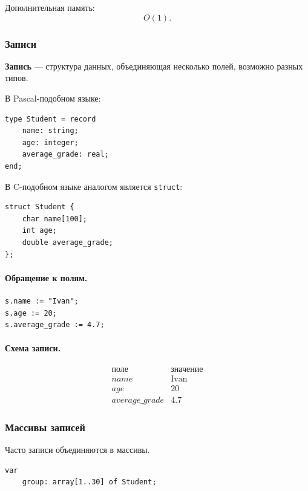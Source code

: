 \documentclass[12pt,a4paper]{article}
\begin{document}
Дополнительная память:
\[
    O(1).
\]

\subsubsection{Записи}

\textbf{Запись} --- структура данных, объединяющая несколько полей, возможно разных типов.

В Pascal-подобном языке:

\begin{verbatim}
type Student = record
    name: string;
    age: integer;
    average_grade: real;
end;
\end{verbatim}

В C-подобном языке аналогом является \texttt{struct}:

\begin{verbatim}
struct Student {
    char name[100];
    int age;
    double average_grade;
};
\end{verbatim}

\paragraph{Обращение к полям.}

\begin{verbatim}
s.name := "Ivan";
s.age := 20;
s.average_grade := 4.7;
\end{verbatim}

\paragraph{Схема записи.}

\[
\begin{array}{c|c}
\text{поле} & \text{значение}\\
\hline
name & \text{Ivan}\\
age & 20\\
average\_grade & 4.7
\end{array}
\]

\subsubsection{Массивы записей}

Часто записи объединяются в массивы.

\begin{verbatim}
var
    group: array[1..30] of Student;
\end{verbatim}
\end{document}
